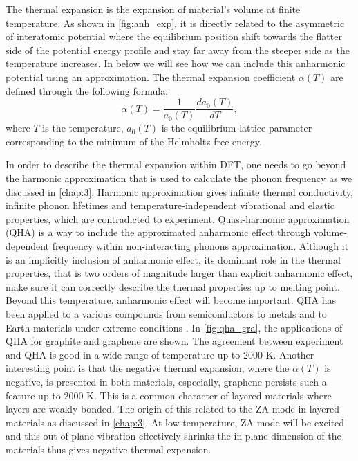 The thermal expansion is the expansion of material's volume at finite temperature. As shown in \autoref{fig:anh_exp}, it is directly related to the asymmetric of interatomic potential where the equilibrium position shift towards the flatter side of the potential energy profile and stay far away from the steeper side as the temperature increases. In below we will see how we can include this anharmonic potential using an approximation. The thermal expansion coefficient $\alpha(T)$ are defined through the following formula: 
\begin{equation}
\alpha(T)=\frac{1}{a_0(T)}\frac{da_0(T)}{dT},
\end{equation}
where $T$ is the temperature, $a_0(T)$ is the equilibrium lattice parameter corresponding to the minimum of the Helmholtz free energy.

In order to describe the thermal expansion within DFT, one needs to go beyond the harmonic approximation that is used to calculate the phonon frequency as we discussed in \autoref{chap:3}. Harmonic approximation gives infinite thermal conductivity, infinite phonon lifetimes and temperature-independent vibrational and elastic properties, which are contradicted to experiment. Quasi-harmonic approximation (QHA)\cite{QHA1,QHA2,QHA3,Baroni39} is a way to include the approximated anharmonic effect through volume-dependent frequency within non-interacting phonons approximation. Although it is an implicitly inclusion of anharmonic effect, its dominant role in the thermal properties, that is two orders of magnitude larger than explicit anharmonic effect, make sure it can correctly describe the thermal properties up to melting point. Beyond this temperature, anharmonic effect will become important. QHA has been applied to a various compounds from semiconductors to metals and to Earth materials under extreme conditions\cite{Hamdi2006,QHA1,Grabowski2009,Karki2000} . In \autoref{fig:qha_gra}, the applications of QHA for graphite and graphene are shown. The agreement between experiment and QHA is good in a wide range of temperature up to 2000 K. Another interesting point is that the negative thermal expansion, where the $\alpha(T)$ is negative, is presented in both materials, especially, graphene persists such a feature up to 2000 K. This is a common character of layered materials where layers are weakly bonded. The origin of this related to the ZA mode in layered materials as discussed in \autoref{chap:3}. At low temperature, ZA mode will be excited and this out-of-plane vibration effectively shrinks the in-plane dimension of the materials thus gives negative thermal expansion.

